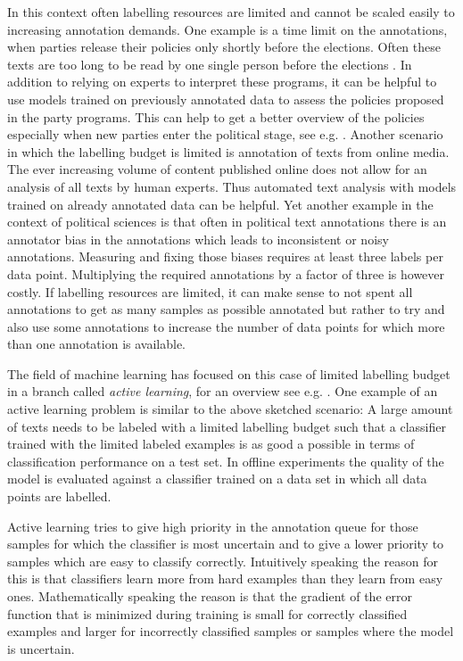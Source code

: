 \documentclass[runningheads,a4paper]{article}
\begin{document}
In this context often labelling resources are limited and cannot be scaled easily to increasing annotation demands. One example is a time limit on the annotations, when parties release their policies only shortly before the elections. Often these texts are too long to be read by one single person before the elections \cite{merz2017}. In addition to relying on experts to interpret these programs, it can be helpful to use models trained on previously annotated data to assess the policies proposed in the party programs. This can help to get a better overview of the policies especially when new parties enter the political stage, see e.g. \cite{bronline}. 
Another scenario in which the labelling budget is limited is annotation of texts from online media. The ever increasing volume of content published online does not allow for an analysis of all texts by human experts. Thus automated text analysis with models trained on already annotated data can be helpful. 
Yet another example in the context of political sciences is that often in political text annotations there is an annotator bias in the annotations which leads to inconsistent or noisy annotations. Measuring and fixing those biases requires at least three labels per data point. Multiplying the required annotations by a factor of three is however costly. If labelling resources are limited, it can make sense to not spent all annotations to get as many samples as possible annotated but rather to try and also use some annotations to increase the number of data points for which more than one annotation is available. 

The field of machine learning has focused on this case of limited labelling budget in a branch called \textit{active learning}, for an overview see e.g. \cite{2012Settles}. One example of an active learning problem is similar to the above sketched scenario: A large amount of texts needs to be labeled with a limited labelling budget such that a classifier trained with the limited labeled examples is as good a possible in terms of classification performance on a test set. In offline experiments the quality of the model is evaluated against a classifier trained on a data set in which all data points are labelled. 

Active learning tries to give high priority in the annotation queue for those samples for which the classifier is most uncertain and to give a lower priority to samples which are easy to classify correctly. Intuitively speaking the reason for this is that classifiers learn more from hard examples than they learn from easy ones. Mathematically speaking the reason is that the gradient of the error function that is minimized during training is small for correctly classified examples and larger for incorrectly classified samples or samples where the model is uncertain.
\end{document}
